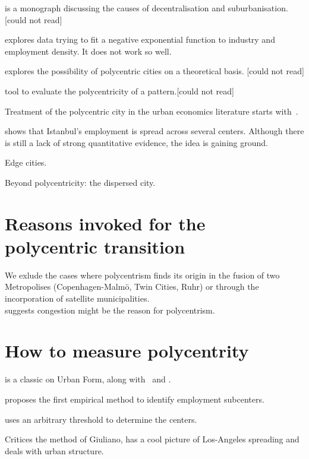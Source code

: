 \cite{Mills:1972} is a monograph discussing the causes of decentralisation and
suburbanisation. [could not read]

\cite{Kemper:1974} explores data trying to fit a negative exponential function
to industry and employment density. It does not work so well.

\cite{Odland:1978} explores the possibility of polycentric cities on a
theoretical basis. [could not read]

\cite{Griffith:1981} tool to evaluate the polycentricity of a pattern.[could not
read]

Treatment of the polycentric city in the urban economics literature starts
with~\cite{Fujita:1982}.

\cite{Dokmeci:1994} shows that Istanbul's employment is spread across several
centers. Although there is still a lack of strong quantitative evidence, the
idea is gaining ground.

\cite{Garreau:1991} Edge cities.

\cite{Gordon:1996} Beyond polycentricity: the dispersed city.

\section{Reasons invoked for the polycentric transition}
\label{sec:reasons_invoked_for_the_polycentric_transition}

We exlude the cases where polycentrism finds its origin in the fusion of two
Metropolises (Copenhagen-Malm\"o, Twin Cities, Ruhr) or through the
incorporation of satellite municipalities.\\


\cite{McMillen:2003} suggests congestion might be the reason for polycentrism.



\section{How to measure polycentrity}
\label{sec:how_to_measure_polycentrity}

\cite{Tsai:2005} is a classic on Urban Form, along with~\cite{LeNechet:2015} and
\cite{Schwarz:2010}.

\cite{McDonald:1987} proposes the first empirical method to identify employment
subcenters.

\cite{Giuliano:1991} uses an arbitrary threshold to determine the centers.

\cite{Anas:1998} Critices the method of Giuliano, has a cool picture of
Los-Angeles spreading and deals with urban structure.


